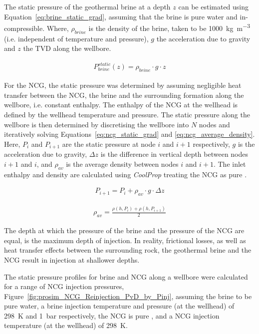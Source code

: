         The static pressure of the geothermal brine at a depth \(z\) can be estimated using Equation~\ref{eq:brine_static_grad}, assuming that the brine is pure water and in-compressible. Where, \(\rho_{brine}\) is the density of the brine, taken to be \qty{1000}{\kg\per\cubic\m} (i.e. independent of temperature and pressure), \(g\) the acceleration due to gravity and \(z\) the \ac{TVD} along the wellbore. 

        \begin{align}
            P_{brine}^{static}(z) = \rho_{brine} \cdot g \cdot z  \label{eq:brine_static_grad}
        \end{align}

        For the \ac{NCG}, the static pressure was determined by assuming negligible heat transfer between the \ac{NCG}, the brine and the surrounding formation along the wellbore, i.e. constant enthalpy. The enthalpy of the \ac{NCG} at the wellhead is defined by the wellhead temperature and pressure. The static pressure along the wellbore is then determined by discretising the wellbore into \(N\) nodes and iteratively solving Equations~\ref{eq:ncg_static_grad} and \ref{eq:ncg_average_density}. Here, \(P_i\) and \(P_{i+1}\) are the static pressure at node \(i\) and \(i+1\) respectively, \(g\) is the acceleration due to gravity, \(\Delta z\) is the difference in vertical depth between nodes \(i+1\) and \(i\), and \(\rho_{av}\) is the average density between nodes \(i\) and \(i+1\). The inlet enthalpy and density are calculated using \emph{CoolProp} treating the \ac{NCG} as pure .

        \begin{align}
            P_{i+1} = P_i + \rho_{av} \cdot g \cdot \Delta z \label{eq:ncg_static_grad}
        \end{align}

        \begin{align}
            \rho_{av} = \frac{\rho (h, P_i) + \rho (h, P_{i+1})}{2} \label{eq:ncg_average_density}
        \end{align}

        The depth at which the pressure of the brine and the pressure of the \ac{NCG} are equal, is the maximum depth of injection. In reality, frictional losses, as well as heat transfer effects between the surrounding rock, the geothermal brine and the \ac{NCG} result in injection at shallower depths.

        The static pressure profiles for brine and \ac{NCG} along a wellbore were calculated for a range of \ac{NCG} injection pressures, Figure~\ref{fig:prosim_NCG_Reinjection_PvD_by_Pinj}, assuming the brine to be pure water, a brine injection temperature and pressure (at the wellhead) of \qty{298}{\K} and \qty{1}{\bar} respectively, the \ac{NCG} is pure , and a \ac{NCG} injection temperature (at the wellhead) of \qty{298}{\K}. 
        
